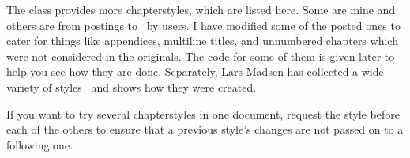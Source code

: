     The class provides more chapterstyles, which are listed here.
Some are mine and others are from postings to \ctt\ by 
users. I have modified some of the posted ones to cater for things like
appendices, multiline titles, and unnumbered chapters which were not
considered in the originals. The code
for some of them is given later to help you see how they are done.
Separately, Lars Madsen has collected a wide variety of
styles~\cite{CHAPSTYLES} and shows how they were created.

    If you want to try several chapterstyles in one document, request the
 style before each of the others to ensure that a previous
style's changes are not passed on to a following one.



\newcommand\PScaveat[1]{
  \smallskip\noindent
  \textbf{Caveat:} The \Pcstyle{#1} style requires the
\Lpack{graphicx} package.
\smallskip
}


